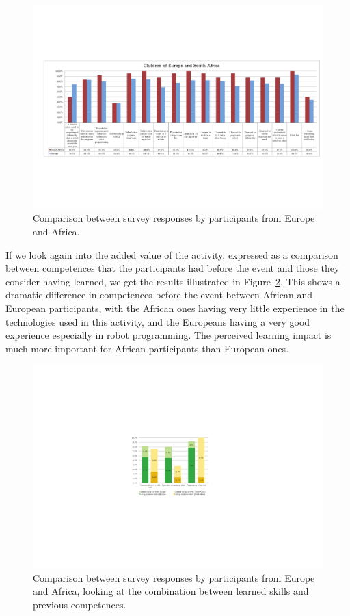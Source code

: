 \documentclass{intech-journal}
\begin{document}
\begin{figure}[ht]
 \centering
    \includegraphics[width=\columnwidth]{figures/all-eu-sa.pdf}
  \caption{Comparison between survey responses by participants from Europe and Africa.}
  \label{fig:EU-SA} 
\end{figure}

If we look again into the added value of the activity, expressed as a comparison between competences that the participants had before the event and those they consider having learned, we get the results illustrated in Figure~\ref{fig:EU-SA-learn}.
This shows a dramatic difference in competences before the event between African and European participants, with the African ones having very little experience in the technologies used in this activity, and the Europeans having a very good experience especially in robot programming. 
The perceived learning impact is much more important for African participants than European ones. 

\begin{figure}[ht]
 \centering
    \includegraphics[width=0.6\columnwidth]{figures/EU-SA-learned.pdf}
  \caption{Comparison between survey responses by participants from Europe and Africa, looking at the combination between learned skills and previous competences.}
  \label{fig:EU-SA-learn} 
\end{figure}
\end{document}
